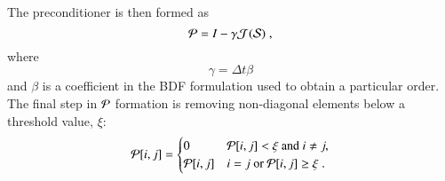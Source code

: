 \documentclass[preprint, 12pt]{elsarticle}
\begin{document}
The preconditioner is then formed as
\begin{equation}
    \mathcal{P} = I - \gamma \mathcal{J}^{}(\mathcal{S}{}) \;,
\end{equation}
where
\begin{equation}
    \gamma = \Delta t \beta
\end{equation}
and $\beta$ is a coefficient in the BDF formulation used to obtain a particular order.
The final step in $\mathcal{P}$ formation is removing non-diagonal elements below a threshold value, $\xi$:
\begin{equation}
    \mathcal{P}[i,j] =
    \begin{cases}
        0 & \mathcal{P}[i,j] < \xi \text{ and } i \neq j, \\
        \mathcal{P}[i,j] & i = j \text{ or } \mathcal{P}[i,j] \geq \xi\;.
    \end{cases}
\end{equation}
\end{document}

